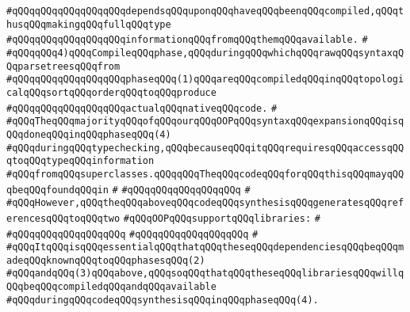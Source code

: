 \verb|#qQQqqQQqqQQqqQQqqQQqdependsqQQquponqQQqhaveqQQqbeenqQQqcompiled,qQQqthusqQQqmakingqQQqfullqQQqtype|\newline
\verb|#qQQqqQQqqQQqqQQqqQQqinformationqQQqfromqQQqthemqQQqavailable.|\newline
\verb|#|\newline
\verb|#qQQqqQQq4)qQQqCompileqQQqphase,qQQqduringqQQqwhichqQQqrawqQQqsyntaxqQQqparsetreesqQQqfrom|\newline
\verb|#qQQqqQQqqQQqqQQqqQQqphaseqQQq(1)qQQqareqQQqcompiledqQQqinqQQqtopologicalqQQqsortqQQqorderqQQqtoqQQqproduce|\newline
\verb|#qQQqqQQqqQQqqQQqqQQqactualqQQqnativeqQQqcode.|\newline
\verb|#|\newline
\verb|#qQQqTheqQQqmajorityqQQqofqQQqourqQQqOOPqQQqsyntaxqQQqexpansionqQQqisqQQqdoneqQQqinqQQqphaseqQQq(4)|\newline
\verb|#qQQqduringqQQqtypechecking,qQQqbecauseqQQqitqQQqrequiresqQQqaccessqQQqtoqQQqtypeqQQqinformation|\newline
\verb|#qQQqfromqQQqsuperclasses.qQQqqQQqTheqQQqcodeqQQqforqQQqthisqQQqmayqQQqbeqQQqfoundqQQqin|\newline
\verb|#|\newline
\verb|#qQQqqQQqqQQqqQQqqQQq|\newline
\verb|#|\newline
\verb|#qQQqHowever,qQQqtheqQQqaboveqQQqcodeqQQqsynthesisqQQqgeneratesqQQqreferencesqQQqtoqQQqtwo|\newline
\verb|#qQQqOOPqQQqsupportqQQqlibraries:|\newline
\verb|#|\newline
\verb|#qQQqqQQqqQQqqQQqqQQq|\newline
\verb|#qQQqqQQqqQQqqQQqqQQq|\newline
\verb|#|\newline
\verb|#qQQqItqQQqisqQQqessentialqQQqthatqQQqtheseqQQqdependenciesqQQqbeqQQqmadeqQQqknownqQQqtoqQQqphasesqQQq(2)|\newline
\verb|#qQQqandqQQq(3)qQQqabove,qQQqsoqQQqthatqQQqtheseqQQqlibrariesqQQqwillqQQqbeqQQqcompiledqQQqandqQQqavailable|\newline
\verb|#qQQqduringqQQqcodeqQQqsynthesisqQQqinqQQqphaseqQQq(4).|\newline
